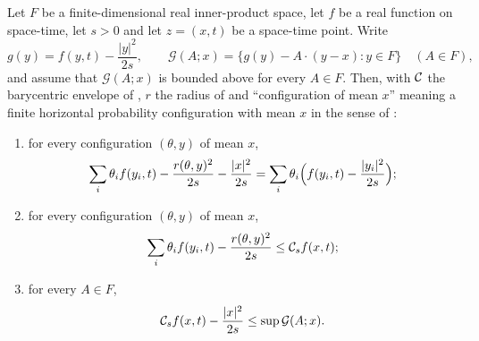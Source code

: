 \begin{lemma}
Let $F$ be a finite-dimensional real inner-product space, let $f$ be a real
function on space-time, let $s>0$ and let $z=(x,t)$ be a space-time point. Write
\[
  g(y)=f(y,t)-\frac{|y|^2}{2s},
  \qquad
  \mathcal G(A;x)=\bigl\{g(y)-A\cdot(y-x):y\in F\bigr\}\quad(A\in F),
\]
and assume that $\mathcal G(A;x)$ is bounded above for every $A\in F$. Then, with
$\mathcal{C}$ the barycentric envelope of , $r$ the radius of
 and ``configuration of mean $x$'' meaning a finite
horizontal probability configuration with mean $x$ in the sense of
:
\begin{enumerate}
\item for every configuration $(\theta,y)$ of mean $x$,
\[
  \sum_i\theta_if(y_i,t)-\frac{r(\theta,y)^2}{2s}-\frac{|x|^2}{2s}
   =\sum_i\theta_i\Bigl(f(y_i,t)-\frac{|y_i|^2}{2s}\Bigr);
\]
\item for every configuration $(\theta,y)$ of mean $x$,
\[
  \sum_i\theta_if(y_i,t)-\frac{r(\theta,y)^2}{2s}\le\mathcal{C}_sf(x,t);
\]
\item for every $A\in F$,
\[
  \mathcal{C}_sf(x,t)-\frac{|x|^2}{2s}\le\sup\mathcal G(A;x).
\]
\end{enumerate}
\end{lemma}
